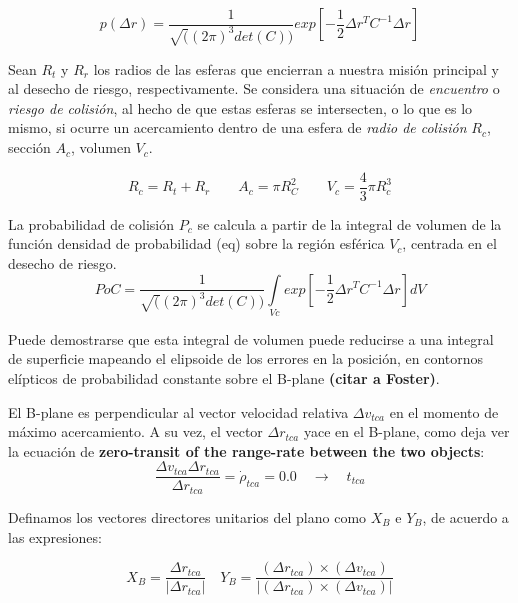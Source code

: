 \begin{equation}
 p(\Delta r)=\frac{1}{\sqrt((2 \pi)^3det(C))} exp[-\frac{1}{2}\Delta r^TC^{-1}\Delta r] 
\end{equation}



Sean $R_{t}$ y $R_{r}$ los radios de las esferas que encierran a nuestra misi\'on principal y al desecho de riesgo, respectivamente. Se considera una situaci\'on de {\it{encuentro}} o {\it{riesgo de colisi\'on}}, al hecho de que estas esferas se intersecten, o lo que es lo mismo, si ocurre un acercamiento dentro de una esfera de {\it{radio de colisi\'on}} $R_{c}$, secci\'on $A_{c}$,  volumen $V_{c}$.

\begin{equation}
R_{c}=R_{t}+R_{r} \qquad A_{c}=\pi R_{C}^{2} \qquad V_{c}=\frac{4}{3} \pi R_{c}^{3}
\end{equation}

La probabilidad de colisi\'on $P_{c}$ se calcula a partir de la integral de volumen de la funci\'on densidad de probabilidad (eq) sobre la regi\'on esf\'erica $V_{c}$, centrada en el desecho de riesgo.
\begin{equation}
PoC=\frac{1}{\sqrt((2\pi)^3det(C))} \int \limits_{Vc} exp[-\frac{1}{2}\Delta r^TC^{-1}\Delta r]dV
\label{eq:poc3d}
\end{equation}

Puede demostrarse que esta integral de volumen puede reducirse a una integral de superficie mapeando el elipsoide  de los errores en la posici\'on, en contornos el\'ipticos de probabilidad constante sobre el B-plane {\bf{(citar a Foster)}}.

El B-plane es perpendicular al vector velocidad relativa $\Delta v_{tca}$ en el momento de m\'aximo acercamiento.
A su vez, el vector $\Delta r_{tca}$ yace en el B-plane, como deja ver la ecuaci\'on de {\bf{zero-transit of the range-rate between the two objects}}:
\begin{equation}
 \frac{\Delta v_{tca} \Delta r_{tca}}{\Delta r_{tca}}= \dot{\rho}_{tca}=0.0 \quad \rightarrow \quad t_{tca}
\end{equation}

Definamos los vectores directores unitarios del plano como $X_{B}$ e $Y_{B}$, de acuerdo a las expresiones:

\begin{equation}
 X_{B}=\frac{\Delta r_{tca}}{|\Delta r_{tca}|} \quad Y_{B}=\frac{(\Delta r_{tca}) \times (\Delta v_{tca})}{|(\Delta r_{tca}) \times (\Delta v_{tca})|}
\end{equation}


